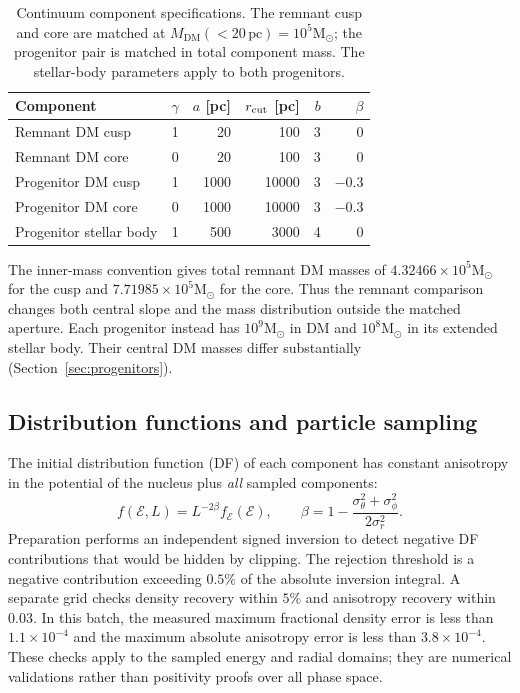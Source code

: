 \documentclass[11pt,a4paper]{article}
\newcommand{\Msun}{\mathrm{M}_{\odot}}
\newcommand{\DM}{\mathrm{DM}}
\newcommand{\pc}{\,\mathrm{pc}}
\newcommand{\Mtwenty}{M_{\DM}(<20\pc)}
\begin{document}
\begin{table}[htbp]
\centering\small
\caption{Continuum component specifications. The remnant cusp and core are
matched at $\Mtwenty=10^5\Msun$; the progenitor pair is matched in total
component mass. The stellar-body parameters apply to both progenitors.}
\label{tab:models}
\begin{tabular}{lrrrrr}
\toprule
Component & $\gamma$ & $a$ [pc] & $r_{\rm cut}$ [pc] & $b$ & $\beta$\\
\midrule
Remnant DM cusp & 1 & 20 & 100 & 3 & 0\\
Remnant DM core & 0 & 20 & 100 & 3 & 0\\
Progenitor DM cusp & 1 & 1000 & 10000 & 3 & $-0.3$\\
Progenitor DM core & 0 & 1000 & 10000 & 3 & $-0.3$\\
Progenitor stellar body & 1 & 500 & 3000 & 4 & 0\\
\bottomrule
\end{tabular}
\end{table}

The inner-mass convention gives total remnant DM masses of
$4.32466\times10^5\Msun$ for the cusp and $7.71985\times10^5\Msun$ for the
core. Thus the remnant comparison changes both central slope and the mass
distribution outside the matched aperture. Each progenitor instead has
$10^9\Msun$ in DM and $10^8\Msun$ in its extended stellar body. Their central
DM masses differ substantially (Section~\ref{sec:progenitors}).

\subsection{Distribution functions and particle sampling}

The initial distribution function (DF) of each component has constant
anisotropy in the potential of the nucleus plus \emph{all} sampled components:
\begin{equation}
 f(\mathcal E,L)=L^{-2\beta}f_{\mathcal E}(\mathcal E),\qquad
 \beta=1-\frac{\sigma_\theta^2+\sigma_\phi^2}{2\sigma_r^2}.
 \label{eq:df}
\end{equation}
Preparation performs an independent signed inversion to detect negative DF
contributions that would be hidden by clipping. The rejection threshold is a
negative contribution exceeding $0.5\%$ of the absolute inversion integral.
A separate grid checks density recovery within $5\%$ and anisotropy recovery
within $0.03$. In this batch, the measured maximum fractional density error is
less than $1.1\times10^{-4}$ and the maximum absolute anisotropy error is less
than $3.8\times10^{-4}$. These checks apply to the sampled energy and radial
domains; they are numerical validations rather than positivity proofs over
all phase space.
\end{document}
